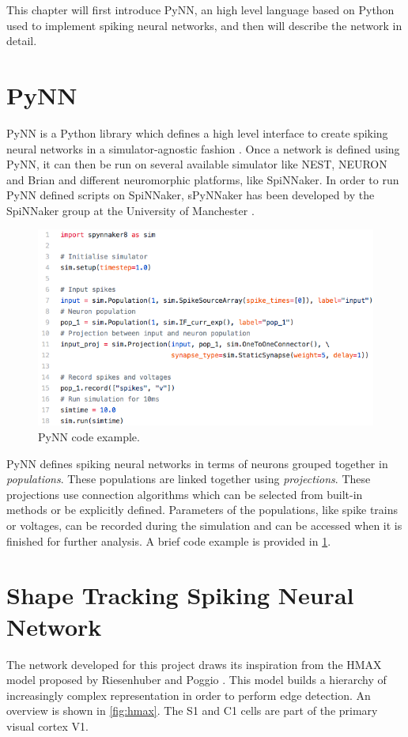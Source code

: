 This chapter will first introduce PyNN, an high level language based on Python used to implement spiking neural networks, and then will describe the network in detail.

\section{PyNN}
PyNN is a Python library which defines a high level interface to create spiking neural networks in a simulator-agnostic fashion \cite{Davison2008}. Once a network is defined using PyNN, it can then be run on several available simulator like NEST, NEURON and Brian and different neuromorphic platforms, like SpiNNaker. In order to run PyNN defined scripts on SpiNNaker, sPyNNaker has been developed by the SpiNNaker group at the University of Manchester \cite{Rhodes2018}.

\begin{figure}[ht]
\centering
\includegraphics[scale=0.5]{images/development/pynn_example.png}
\caption[PyNN Example]{PyNN code example.}
\label{fig:pynn_example}
\end{figure}

PyNN defines spiking neural networks in terms of neurons grouped together in \emph{populations}. These populations are linked together using \emph{projections}. These projections use connection algorithms which can be selected from built-in methods or be explicitly defined. Parameters of the populations, like spike trains or voltages, can be recorded during the simulation and can be accessed when it is finished for further analysis. A brief code example is provided in \cref{fig:pynn_example}. 

\section{Shape Tracking Spiking Neural Network}
The network developed for this project draws its inspiration from the HMAX model proposed by Riesenhuber and Poggio \cite{Riesenhuber1999}. This model builds a hierarchy of increasingly complex representation in order to perform edge detection. An overview is shown in \cref{fig:hmax}. The \textsc{S1} and \textsc{C1} cells are part of the primary visual cortex V1.  

